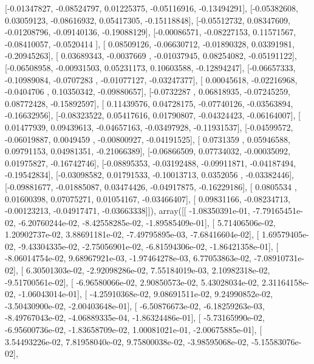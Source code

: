 \documentclass{article}
\begin{document}
       [-0.01347827, -0.08524797,  0.01225375, -0.05116916, -0.13494291],
       [-0.05382608,  0.03059123, -0.08616932,  0.05417305, -0.15118848],
       [-0.05512732,  0.08347609, -0.01208796, -0.09140136, -0.19088129],
       [-0.00086571, -0.08227153,  0.11571567, -0.08410057, -0.0520414 ],
       [ 0.08509126, -0.06630712, -0.01890328,  0.03391981, -0.20945263],
       [ 0.03689343, -0.0037669 , -0.01037945,  0.08254082, -0.05191122],
       [-0.06508958, -0.00931503,  0.05231173,  0.10603588, -0.12894247],
       [-0.06657333, -0.10989084, -0.0707283 , -0.01077127, -0.03247377],
       [ 0.00045618, -0.02216968, -0.0404706 ,  0.10350342, -0.09880657],
       [-0.0732287 ,  0.06818935, -0.07245259,  0.08772428, -0.15892597],
       [ 0.11439576,  0.04728175, -0.07740126, -0.03563894, -0.16632956],
       [-0.08323522,  0.05417616,  0.01790807, -0.04324423, -0.06164007],
       [ 0.01477939,  0.09439613, -0.04657163, -0.03497928, -0.11931537],
       [-0.04599572, -0.06019887,  0.0049459 , -0.00800927, -0.04191525],
       [ 0.0731359 ,  0.05946588,  0.09791153,  0.04981351, -0.21066389],
       [-0.06866509,  0.07734032, -0.00035092,  0.01975827, -0.16742746],
       [-0.08895353, -0.03192488, -0.09911871, -0.04187494, -0.19542834],
       [-0.03098582,  0.01791533, -0.10013713,  0.0352056 , -0.03382446],
       [-0.09881677, -0.01885087,  0.03474426, -0.04917875, -0.16229186],
       [ 0.0805534 ,  0.01600398,  0.07075271,  0.01054167, -0.03466407],
       [ 0.09831166, -0.08234713, -0.00123213, -0.04917471, -0.03663338]]), array([[ -1.08350391e-01,  -7.79165451e-02,  -6.20760244e-02,
         -8.42558285e-02,  -1.89585409e-01],
       [  5.71406506e-02,   1.20902737e-02,   3.88691181e-02,
         -7.49795895e-03,  -7.68416604e-02],
       [  1.69579405e-02,  -9.43304335e-02,  -2.75056901e-02,
         -6.81594306e-02,  -1.86421358e-01],
       [ -8.06014754e-02,   9.68967921e-03,  -1.97464278e-03,
          6.77053863e-02,  -7.08910731e-02],
       [  6.30501303e-02,  -2.92098286e-02,   7.55184019e-03,
          2.10982318e-02,  -9.51700561e-02],
       [ -6.96580066e-02,   2.90850573e-02,   5.43028034e-02,
          2.31164158e-02,  -1.06043014e-01],
       [ -4.25910368e-02,   9.08691511e-02,   9.24990852e-02,
         -3.50430900e-02,  -2.00403648e-01],
       [ -6.50876673e-02,  -6.18259263e-03,  -8.49767043e-02,
         -4.06889335e-04,  -1.86324486e-01],
       [ -5.73165990e-02,  -6.95600736e-02,  -1.83658709e-02,
          1.00081021e-01,  -2.00675885e-01],
       [  3.54493226e-02,   7.81958040e-02,   9.75800038e-02,
         -3.98595068e-02,  -5.15583076e-02],
\end{document}
